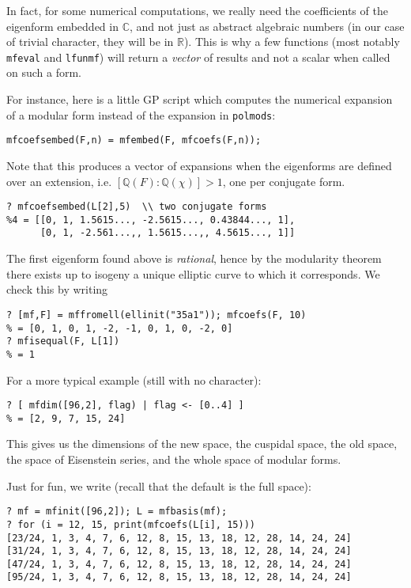 \documentclass[11pt]{article}
\newcommand{\Q}{{\mathbb Q}}
\newcommand{\R}{{\mathbb R}}
\newcommand{\C}{{\mathbb C}}
\def\kbd#1{{\tt #1}}
\begin{document}
In fact, for some numerical computations, we really need the
coefficients of the eigenform embedded in $\C$, and not just as abstract
algebraic numbers (in our case of trivial character, they will be in $\R$).
This is why a few functions (most notably \kbd{mfeval} and \kbd{lfunmf})
will return a \emph{vector} of results and not a scalar when called on such
a form.

For instance, here is a little GP script which computes the numerical
expansion of a modular form instead of the expansion in \kbd{polmods}:

\begin{verbatim}
mfcoefsembed(F,n) = mfembed(F, mfcoefs(F,n));
\end{verbatim}

Note that this produces a vector of expansions when the eigenforms
are defined over an extension, i.e. $[\Q(F):\Q(\chi)] > 1$, one per conjugate
form.
\begin{verbatim}
? mfcoefsembed(L[2],5)  \\ two conjugate forms
%4 = [[0, 1, 1.5615..., -2.5615..., 0.43844..., 1],
      [0, 1, -2.561...,, 1.5615...,, 4.5615..., 1]]
\end{verbatim}

The first eigenform found above is \emph{rational}, hence by the modularity
theorem there exists up to isogeny a unique elliptic curve to which it
corresponds. We check this by writing

\begin{verbatim}
? [mf,F] = mffromell(ellinit("35a1")); mfcoefs(F, 10)
% = [0, 1, 0, 1, -2, -1, 0, 1, 0, -2, 0]
? mfisequal(F, L[1])
% = 1
\end{verbatim}

For a more typical example (still with no character):

\begin{verbatim}
? [ mfdim([96,2], flag) | flag <- [0..4] ]
% = [2, 9, 7, 15, 24]
\end{verbatim}

This gives us the dimensions of the new space, the cuspidal space,
the old space, the space of Eisenstein series, and the whole space of
modular forms.

Just for fun, we write (recall that the default is the full space):
\begin{verbatim}
? mf = mfinit([96,2]); L = mfbasis(mf);
? for (i = 12, 15, print(mfcoefs(L[i], 15)))
[23/24, 1, 3, 4, 7, 6, 12, 8, 15, 13, 18, 12, 28, 14, 24, 24]
[31/24, 1, 3, 4, 7, 6, 12, 8, 15, 13, 18, 12, 28, 14, 24, 24]
[47/24, 1, 3, 4, 7, 6, 12, 8, 15, 13, 18, 12, 28, 14, 24, 24]
[95/24, 1, 3, 4, 7, 6, 12, 8, 15, 13, 18, 12, 28, 14, 24, 24]
\end{verbatim}
\end{document}
